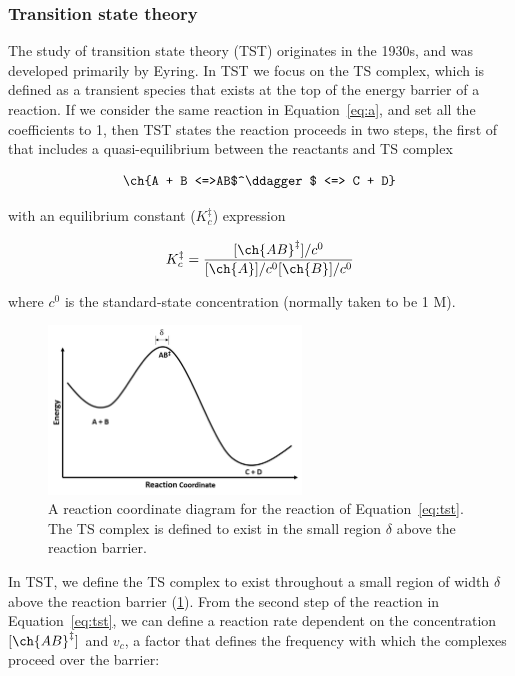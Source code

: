 \subsubsection{Transition state theory}

The study of transition state theory (TST) originates in the 1930s, and was
developed primarily by Eyring.\cite{McQuarrie1997,Steinfeld1998} In TST we
focus on the TS complex, which is defined as a transient species that exists
at the top of the energy barrier of a reaction. If we consider the same
reaction in Equation~\ref{eq:a}, and set all the coefficients to 1, then TST
states the reaction proceeds in two steps, the first of that includes a
quasi-equilibrium between the reactants and TS complex

\begin{equation}
  \ch{A + B <=>AB$^\ddagger$ <=> C + D}
  \label{eq:tst}
\end{equation}

\noindent with an equilibrium constant ($K_c^{\ddagger}$) expression

\begin{equation}
  K_c^{\ddagger} = \frac{[\ch{AB}^\ddagger]/c^0}{[\ch{A}]/c^0[\ch{B}]/c^0}
\label{eq:K}
\end{equation}

\noindent where $c^0$ is the standard-state concentration (normally taken to be
1 M).

\begin{figure}[htb]
    \centering
    \includegraphics[width=0.6\textwidth]{figures/TST-PES.png}
    \caption[A reaction coordinate diagram for a generic reaction.]{A reaction coordinate diagram for the reaction of Equation~\ref{eq:tst}. The TS complex is defined to exist in the small region $\delta$ above the reaction barrier.}
\label{fig:tst-pes}
\end{figure}

In TST, we define the TS complex to exist throughout a small region of width
$\delta$ above the reaction barrier (\ref{fig:tst-pes}). From the second step
of the reaction in Equation~\ref{eq:tst}, we can define a reaction rate
dependent on the concentration $[\ch{AB}^\ddagger]$ and $v_c$, a factor that
defines the frequency with which the complexes proceed over the barrier:

